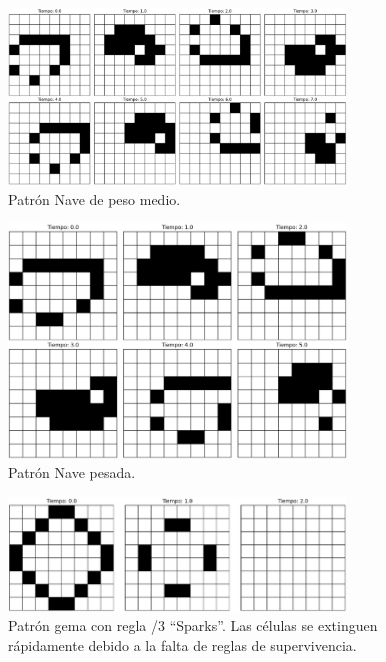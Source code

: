 \documentclass[12pt]{article}
\begin{document}
\begin{figure}
  \centering
  \includegraphics[width=0.8\textwidth]{imagenes/nave3.png}
  \caption{Patrón Nave de peso medio.\label{img:nave3}}
\end{figure}

\begin{figure}
  \centering
  \includegraphics[width=0.8\textwidth]{imagenes/nave4.png}
  \caption{Patrón Nave pesada.\label{img:nave4}}
\end{figure}

\begin{figure}
  \centering
  \includegraphics[width=0.8\textwidth]{imagenes/sparks.png}
  \caption{Patrón gema con regla /3 ``Sparks''. Las células se extinguen rápidamente debido a la falta de reglas de supervivencia.\label{img:sparks}}
\end{figure}
\end{document}
